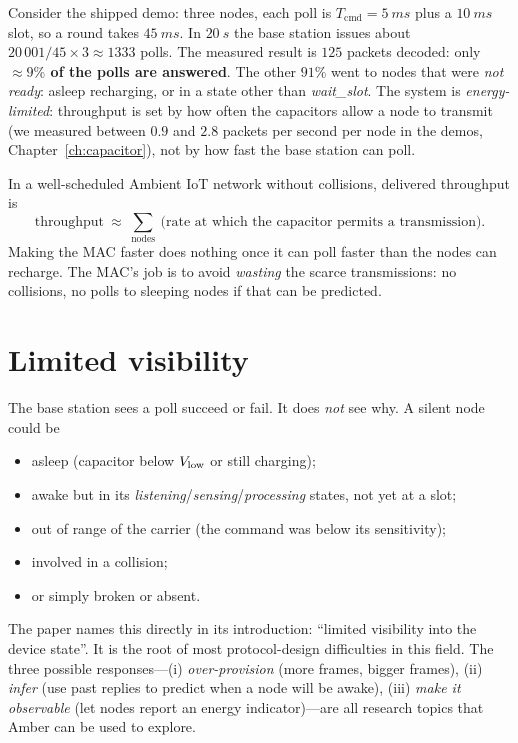 Consider the shipped  demo: three nodes, each poll is $T_{\mathrm{cmd}}=\SI{5}{ms}$ plus a $\SI{10}{ms}$ slot, so a round takes $\SI{45}{ms}$. In $\SI{20}{s}$ the base station issues about $20\,001/45\times3\approx1333$ polls. The measured result is $125$ packets decoded: only \textbf{$\approx9\%$ of the polls are answered}. The other $91\%$ went to nodes that were \emph{not ready}: asleep recharging, or in a state other than \emph{wait\_slot}. The system is \emph{energy-limited}: throughput is set by how often the capacitors allow a node to transmit (we measured between $0.9$ and $2.8$ packets per second per node in the demos, Chapter~\ref{ch:capacitor}), not by how fast the base station can poll.

\begin{keyidea}
In a well-scheduled Ambient IoT network without collisions, delivered throughput is
\[
 \text{throughput}\ \approx\ \sum_{\text{nodes}}\ \text{(rate at which the capacitor permits a transmission)}.
\]
Making the MAC faster does nothing once it can poll faster than the nodes can recharge. The MAC's job is to avoid \emph{wasting} the scarce transmissions: no collisions, no polls to sleeping nodes if that can be predicted.
\end{keyidea}

\section{Limited visibility}
\label{sec:visibility}

The base station sees a poll succeed or fail. It does \emph{not} see why. A silent node could be
\begin{itemize}
 \item asleep (capacitor below $V_{\mathrm{low}}$ or still charging);
 \item awake but in its \emph{listening}/\emph{sensing}/\emph{processing} states, not yet at a slot;
 \item out of range of the carrier (the command was below its sensitivity);
 \item involved in a collision;
 \item or simply broken or absent.
\end{itemize}
The paper names this directly in its introduction: ``limited visibility into the device state''. It is the root of most protocol-design difficulties in this field.
The three possible responses---(i) \emph{over-provision} (more frames, bigger frames), (ii) \emph{infer} (use past replies to predict when a node will be awake), (iii) \emph{make it observable} (let nodes report an energy indicator)---are all research topics that Amber can be used to explore.

